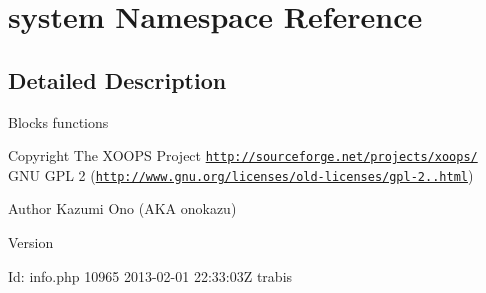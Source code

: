 \hypertarget{namespacesystem}{\section{system Namespace Reference}
\label{namespacesystem}
}


\subsection{Detailed Description}
Blocks functions

\begin{DoxyCopyright}{Copyright}
The X\-O\-O\-P\-S Project \href{http://sourceforge.net/projects/xoops/}{\tt http\-://sourceforge.\-net/projects/xoops/}  G\-N\-U G\-P\-L 2 (\href{http://www.gnu.org/licenses/old-licenses/gpl-2.0.html}{\tt http\-://www.\-gnu.\-org/licenses/old-\/licenses/gpl-\/2..\-html}) 
\end{DoxyCopyright}
\begin{DoxyAuthor}{Author}
Kazumi Ono (A\-K\-A onokazu)
\end{DoxyAuthor}
\begin{DoxyVersion}{Version}

\end{DoxyVersion}
\begin{DoxyParagraph}{Id\-:}
info.\-php 10965 2013-\/02-\/01 22\-:33\-:03\-Z trabis 
\end{DoxyParagraph}

